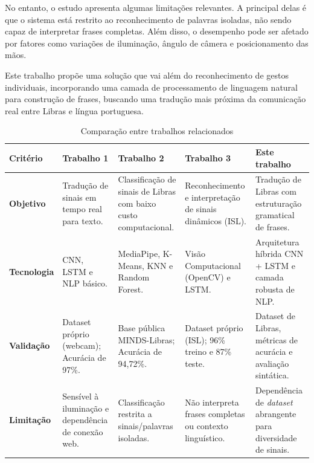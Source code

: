 \documentclass[
    12pt,                %
    openright,           %
    oneside,             %
    a4paper,             %
    english,             %
    brazil               %
]{abntex2}
\begin{document}
No entanto, o estudo apresenta algumas limitações relevantes. A principal delas é que o sistema está restrito ao reconhecimento de palavras isoladas, não sendo capaz de interpretar frases completas. Além disso, o desempenho pode ser afetado por fatores como variações de iluminação, ângulo de câmera e posicionamento das mãos.

Este trabalho propõe uma solução que vai além do reconhecimento de gestos individuais, incorporando uma camada de processamento de linguagem natural para construção de frases, buscando uma tradução mais próxima da comunicação real entre Libras e língua portuguesa.

\vspace{0.5cm}

\begin{table}[htb]
    \centering
    \caption{Comparação entre trabalhos relacionados}
    \label{tab:trabalhos_relacionados}
    \small %
    \begin{tabular}{p{2cm}|p{3cm}|p{3cm}|p{3cm}|p{3cm}}
        \toprule
        \textbf{Critério} & \textbf{Trabalho 1} & \textbf{Trabalho 2} & \textbf{Trabalho 3} & \textbf{Este trabalho} \\
        \midrule
        \textbf{Objetivo} 
        & Tradução de sinais em tempo real para texto. 
        & Classificação de sinais de Libras com baixo custo computacional. 
        & Reconhecimento e interpretação de sinais dinâmicos (ISL). 
        & Tradução de Libras com estruturação gramatical de frases. \\
        \midrule
        \textbf{Tecnologia} 
        & CNN, LSTM e NLP básico. 
        & MediaPipe, K-Means, KNN e Random Forest. 
        & Visão Computacional (OpenCV) e LSTM. 
        & Arquitetura híbrida CNN + LSTM e camada robusta de NLP. \\
        \midrule
        \textbf{Validação} 
        & Dataset próprio (webcam); Acurácia de 97\%. 
        & Base pública MINDS-Libras; Acurácia de 94,72\%. 
        & Dataset próprio (ISL); 96\% treino e 87\% teste. 
        & Dataset de Libras, métricas de acurácia e avaliação sintática. \\
        \midrule
        \textbf{Limitação} 
        & Sensível à iluminação e dependência de conexão web. 
        & Classificação restrita a sinais/palavras isoladas. 
        & Não interpreta frases completas ou contexto linguístico. 
        & Dependência de \textit{dataset} abrangente para diversidade de sinais. \\
        \bottomrule
    \end{tabular}
    \\
\end{table}
\end{document}
